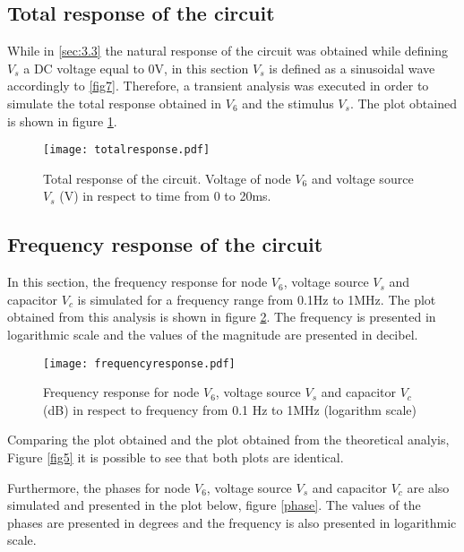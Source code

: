 \subsection{Total response of the circuit}
\label{sec:3.4}

While in \ref{sec:3.3} the natural response of the circuit was obtained while defining $V_s$ a DC voltage equal to 0V, in this section $V_s$ is defined as a sinusoidal wave accordingly to \ref{fig7}.
Therefore, a transient analysis was executed in order to simulate the total response obtained in $V_6$ and the stimulus $V_s$. The plot obtained is shown in figure \ref{totalresponse}.

\begin{figure}[!htp] \centering
\texttt{[image: totalresponse.pdf]}
\captionsetup{justification=centering, margin=2cm}
\caption{Total response of the circuit. Voltage of node $V_6$ and voltage source $V_s$ (V) in respect to time from 0 to 20ms.}
\label{totalresponse}
\end{figure}
\FloatBarrier

\clearpage

\subsection{Frequency response of the circuit}
\label{sec:3.5}

In this section, the frequency response for node $V_6$, voltage source $V_s$ and capacitor $V_c$ is simulated for a frequency range from 0.1Hz to 1MHz. The plot obtained from this analysis is shown in figure \ref{frequencyresponse}. The frequency is presented in logarithmic scale and the values of the magnitude are presented in decibel. 

\begin{figure}[!htp] \centering
\texttt{[image: frequencyresponse.pdf]}
\captionsetup{justification=centering, margin=2cm}
\caption{Frequency response for node $V_6$, voltage source $V_s$ and capacitor $V_c$ (dB) in respect to frequency from 0.1 Hz to 1MHz (logarithm scale)}
\label{frequencyresponse}
\end{figure}
\FloatBarrier

Comparing the plot obtained and the plot obtained from the theoretical analyis, Figure \ref{fig5} it is possible to see that both plots are identical.

Furthermore, the phases for node $V_6$, voltage source $V_s$ and capacitor $V_c$ are also simulated and presented in the plot below, figure \ref{phase}. The values of the phases are presented in degrees and the frequency is also presented in logarithmic scale.

